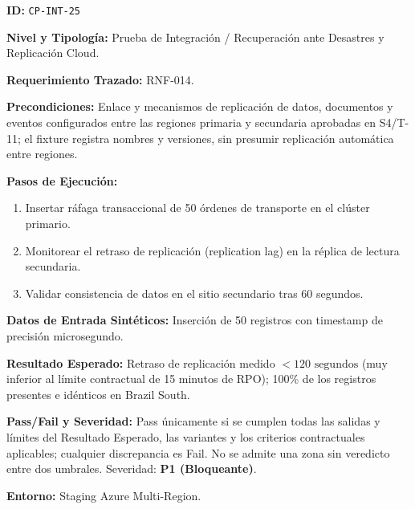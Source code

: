 \par\noindent \textbf{ID:} \texttt{CP-\allowbreak{}INT-\allowbreak{}25}\par
\par\noindent \textbf{Nivel y Tipología:} Prueba de Integración / Recuperación ante Desastres y Replicación Cloud.\par
\par\noindent \textbf{Requerimiento Trazado:} RNF-014.\par
\par\noindent \textbf{Precondiciones:} Enlace y mecanismos de replicación de datos, documentos y eventos configurados entre las regiones primaria y secundaria aprobadas en S4/T-11; el fixture registra nombres y versiones, sin presumir replicación automática entre regiones.\par
\par\noindent \textbf{Pasos de Ejecución:}\par
\begin{enumerate}
\item Insertar ráfaga transaccional de 50 órdenes de transporte en el clúster primario.
\item Monitorear el retraso de replicación (replication lag) en la réplica de lectura secundaria.
\item Validar consistencia de datos en el sitio secundario tras 60 segundos.
\end{enumerate}

\par\noindent \textbf{Datos de Entrada Sintéticos:} Inserción de 50 registros con timestamp de precisión microsegundo.\par
\par\noindent \textbf{Resultado Esperado:} Retraso de replicación medido $< 120\text{ segundos}$ (muy inferior al límite contractual de 15 minutos de RPO); 100\% de los registros presentes e idénticos en Brazil South.\par
\par\noindent \textbf{Pass/Fail y Severidad:} Pass únicamente si se cumplen todas las salidas y límites del Resultado Esperado, las variantes y los criterios contractuales aplicables; cualquier discrepancia es Fail. No se admite una zona sin veredicto entre dos umbrales. Severidad: \textbf{P1 (Bloqueante)}.\par
\par\noindent \textbf{Entorno:} Staging Azure Multi-Region.\par


